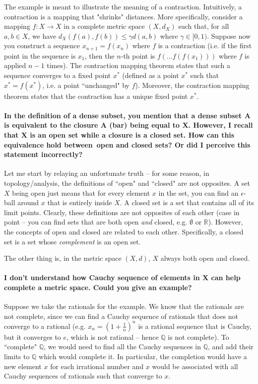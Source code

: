 \documentclass[10pt,english]{article}
\begin{document}
The example is meant to illustrate the meaning of a contraction. Intuitively, a contraction is a mapping that "shrinks" distances. More specifically, consider a mapping $f: X \rightarrow X$ in a complete metric space $(X,d_X)$ such that, for all $a,b \in X$, we have $d_X(f(a),f(b)) \leq \gamma d(a,b)$ where $\gamma \in [0,1)$.
Suppose now you construct a sequence $x_{n+1} = f(x_n)$ where $f$ is a contraction (i.e. if the first point in the sequence is $x_1$, then the $n$-th point is $f(...f(f(x_1)))$ where $f$ is applied $n-1$ times). The contraction mapping theorem states that such a sequence converges to a fixed point $x^*$ (defined as a point $x^*$ such that $x^* = f(x^*)$, i.e. a point ``unchanged" by $f$). Moreover, the contraction mapping theorem states that the contraction has a unique fixed point $x^*$.


\paragraph{In the definition of a dense subset, you mention that a dense subset A is equivalent to the closure A (bar) being equal to X. However, I recall that X is an open set while a closure is a closed set. How can this equivalence hold between open and closed sets? Or did I perceive this statement incorrectly?}

Let me start by relaying an unfortunate truth -- for some reason, in topology/analysis, the definitions of ``open" and ``closed" are not opposites. A set $X$ being open just means that for every element $x$ in the set, you can find an $\epsilon$-ball around $x$ that is entirely inside $X$. A closed set is a set that contains all of its limit points.
Clearly, these definitions are not opposites of each other (case in point -- you can find sets that are both open \textit{and} closed, e.g. $\emptyset$ or $\mathbb{R}$).
However, the concepts of open and closed are related to each other. Specifically, a closed set is a set whose \textit{complement} is an open set.

The other thing is, in the metric space $(X,d)$, $X$ always both open and closed.

\paragraph{I don't understand how Cauchy sequence of elements in X can help complete a metric space. Could you give an example?}

Suppose we take the rationals for the example. We know that the rationals are not complete, since we can find a Cauchy sequence of rationals that does not converge to a rational (e.g. $x_n = (1+\frac{1}{n})^n$ is a rational sequence that is Cauchy, but it converges to $e$, which is not rational -- hence $\mathbb{Q}$ is not complete).
To ``complete" $\mathbb{Q}$, we would need to find all the Cauchy sequences in $\mathbb{Q}$, and add their limits to $\mathbb{Q}$ which would complete it.
In particular, the completion would have a new element $x$ for each irrational number and $x$ would be associated with all Cauchy sequences of rationals such that converge to $x$.
\end{document}

